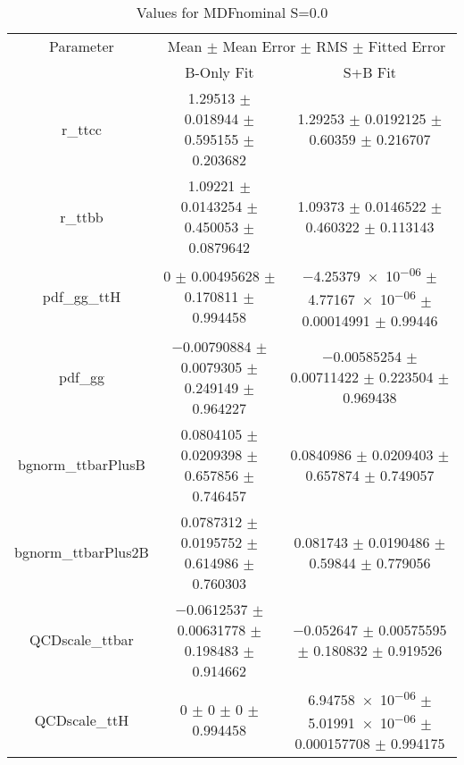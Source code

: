 \begin{table}
\centering
\caption{Values for MDFnominal S=0.0}
\begin{tabular}{ccc}
\toprule
Parameter & \multicolumn{2}{c}{Mean $\pm$ Mean Error $\pm$ RMS $\pm$ Fitted Error}\\
 & B-Only Fit & S+B Fit\\
\midrule
r\_ttcc & \num{1.29513} $\pm$ \num{0.018944} $\pm$ \num{0.595155} $\pm$ \num{0.203682} & \num{1.29253} $\pm$ \num{0.0192125} $\pm$ \num{0.60359} $\pm$ \num{0.216707}\\
r\_ttbb & \num{1.09221} $\pm$ \num{0.0143254} $\pm$ \num{0.450053} $\pm$ \num{0.0879642} & \num{1.09373} $\pm$ \num{0.0146522} $\pm$ \num{0.460322} $\pm$ \num{0.113143}\\
pdf\_gg\_ttH & \num{0} $\pm$ \num{0.00495628} $\pm$ \num{0.170811} $\pm$ \num{0.994458} & \num{-4.25379e-06} $\pm$ \num{4.77167e-06} $\pm$ \num{0.00014991} $\pm$ \num{0.99446}\\
pdf\_gg & \num{-0.00790884} $\pm$ \num{0.0079305} $\pm$ \num{0.249149} $\pm$ \num{0.964227} & \num{-0.00585254} $\pm$ \num{0.00711422} $\pm$ \num{0.223504} $\pm$ \num{0.969438}\\
bgnorm\_ttbarPlusB & \num{0.0804105} $\pm$ \num{0.0209398} $\pm$ \num{0.657856} $\pm$ \num{0.746457} & \num{0.0840986} $\pm$ \num{0.0209403} $\pm$ \num{0.657874} $\pm$ \num{0.749057}\\
bgnorm\_ttbarPlus2B & \num{0.0787312} $\pm$ \num{0.0195752} $\pm$ \num{0.614986} $\pm$ \num{0.760303} & \num{0.081743} $\pm$ \num{0.0190486} $\pm$ \num{0.59844} $\pm$ \num{0.779056}\\
QCDscale\_ttbar & \num{-0.0612537} $\pm$ \num{0.00631778} $\pm$ \num{0.198483} $\pm$ \num{0.914662} & \num{-0.052647} $\pm$ \num{0.00575595} $\pm$ \num{0.180832} $\pm$ \num{0.919526}\\
QCDscale\_ttH & \num{0} $\pm$ \num{0} $\pm$ \num{0} $\pm$ \num{0.994458} & \num{6.94758e-06} $\pm$ \num{5.01991e-06} $\pm$ \num{0.000157708} $\pm$ \num{0.994175}\\
\bottomrule
\end{tabular}
\end{table}